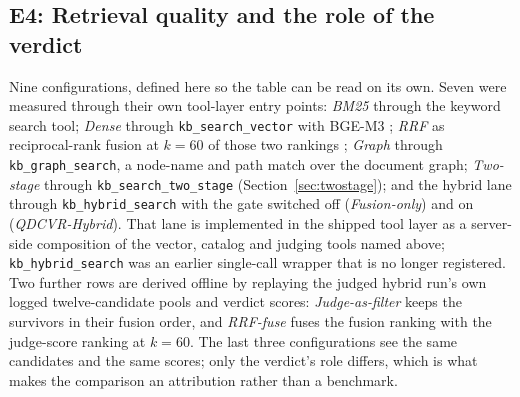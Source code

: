 \subsection{E4: Retrieval quality and the role of the verdict}
\label{sec:e4}
\label{sec:eval-retrieval}

Nine configurations, defined here so the table can be read on its own. Seven
were measured through their own tool-layer entry points: \emph{BM25} through the
keyword search tool; \emph{Dense} through \texttt{kb\_search\_vector} with
BGE-M3 \cite{bge-m3}; \emph{RRF} as reciprocal-rank fusion at $k=60$ of those
two rankings \cite{rrf-cormack}; \emph{Graph} through
\texttt{kb\_graph\_search}, a node-name and path match over the document graph;
\emph{Two-stage} through \texttt{kb\_search\_two\_stage}
(Section~\ref{sec:twostage}); and the hybrid lane through
\texttt{kb\_hybrid\_search} with the gate switched off
(\emph{Fusion-only}) and on (\emph{QDCVR-Hybrid}). That lane is implemented in
the shipped tool layer as a server-side composition of the vector, catalog and
judging tools named above; \texttt{kb\_hybrid\_search} was an earlier single-call
wrapper that is no longer registered. Two further rows are derived
offline by replaying the judged hybrid run's own logged twelve-candidate pools
and verdict scores: \emph{Judge-as-filter} keeps the survivors in their fusion
order, and \emph{RRF-fuse} fuses the fusion ranking with the judge-score
ranking at $k=60$. The last three configurations see the same candidates and
the same scores; only the verdict's role differs, which is what makes the
comparison an attribution rather than a benchmark.

